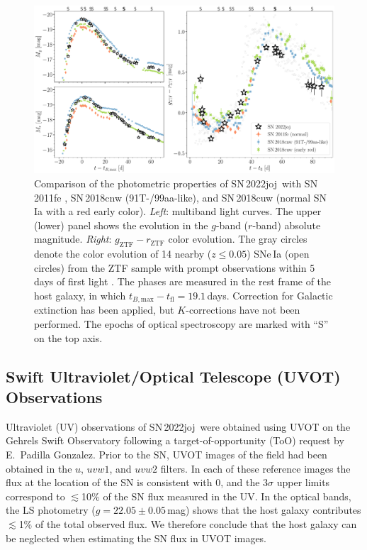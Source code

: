 \documentclass[twocolumn]{aastex631}
\newcommand{\sn}{SN\,2022joj}
\begin{document}
\begin{CJK*}{UTF8}{gbsn}
\begin{figure}
    \centering
    \includegraphics[width=\textwidth]{photometry.pdf}
    \caption{Comparison of the photometric properties of \sn\ with SN\,2011fe \citep[normal SN\,Ia;][]{Pereira_2013}, SN\,2018cnw (91T-/99aa-like), and SN\,2018cuw (normal SN\,Ia with a red early color). \textit{Left}: multiband light curves. The upper (lower) panel shows the evolution in the $g$-band ($r$-band) absolute magnitude.
    \textit{Right}: $g_\mathrm{ZTF}-r_\mathrm{ZTF}$ color evolution. 
    The gray circles denote the color evolution of 14 nearby ($z\le0.05$) SNe\,Ia (open circles) from the ZTF sample with prompt observations within 5\,days of first light \citep{Bulla2020}. The phases are measured in the rest frame of the host galaxy, in which $t_{B, \mathrm{max}} - t_\mathrm{fl}=19.1$\,days. Correction for Galactic extinction has been applied, but $K$-corrections have not been performed. The epochs of optical spectroscopy are marked with ``S'' on the top axis.}
    \label{fig:lc}
\end{figure}

\subsection{Swift Ultraviolet/Optical Telescope (UVOT) Observations}
Ultraviolet (UV) observations of \sn\ were obtained using UVOT \citep{UVOT_2005} on the Gehrels Swift Observatory \citep[Swift;][]{Swift_2004} following a target-of-opportunity (ToO) request by E.~Padilla Gonzalez. Prior to the SN, UVOT images of the field had been obtained in the $u$, $uvw1$, and $uvw2$ filters. In each of these reference images the flux at the location of the SN is consistent with 0, and the 3$\sigma$ upper limits correspond to $\lesssim$10\% of the SN flux measured in the UV. In the optical bands, the LS photometry ($g = 22.05\pm0.05$\,mag) shows that the host galaxy contributes $\lesssim$1\% of the total observed flux. We therefore conclude that the host galaxy can be neglected when estimating the SN flux in UVOT images.


\end{CJK*}
\end{document}
